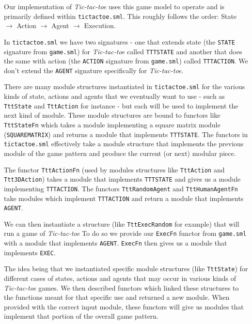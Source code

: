 \documentclass[9pt,letterpaper]{extarticle}
\begin{document}
  Our implementation of \textit{Tic-tac-toe} uses this game model to operate and
  is primarily defined within \texttt{tictactoe.sml}.
  This roughly follows the order:
  State $\rightarrow$ Action $\rightarrow$ Agent $\rightarrow$ Execution.

  In \texttt{tictactoe.sml} we have two signatures - one that extends state
  (the \texttt{STATE} signature from \texttt{game.sml}) for \textit{Tic-tac-toe}
  called \texttt{TTTSTATE} and another that does the same with action
  (the \texttt{ACTION} signature from \texttt{game.sml}) called
  \texttt{TTTACTION}.
  We don't extend the \texttt{AGENT} signature specifically for \textit{Tic-tac-toe}.

  There are many module structures instantiated in \texttt{tictactoe.sml}
  for the various kinds of state, actions and agents that we eventually want to
  use - such as \texttt{TttState} and \texttt{TttAction} for instance - but each will
  be used to implement the next kind of module.
  These module structures are bound to functors like \texttt{TttStateFn} which
  takes a module implementing a square matrix module (\texttt{SQUAREMATRIX})
  and returns a module that implements \texttt{TTTSTATE}. The functors in
  \texttt{tictactoe.sml} effectively take a module structure that implements the
  previous module of the game pattern and produce the current (or next)
  modular piece.
  
  The functor \texttt{TttActionFn} (used by modules structures like
  \texttt{TttAction} and \texttt{Ttt3DAction}) takes a module that implements
  \texttt{TTTSTATE} and gives us a module implementing \texttt{TTTACTION}.
  The functors \texttt{TttRandomAgent} and \texttt{TttHumanAgentFn} take
  modules which implement \texttt{TTTACTION} and return a module that implements
  \texttt{AGENT}.

  We can then instantiate a structure (like \texttt{TttExecRandom} for example)
  that will run a game of \textit{Tic-tac-toe}
  To do so we provide our \texttt{ExecFn} functor from
  \texttt{game.sml} with a module that implements \texttt{AGENT}.
  \texttt{ExecFn} then gives us a module that implements \texttt{EXEC}.
  
  The idea being that we instantiated specific module structures
  (like \texttt{TttState}) for different cases of states, actions and agents
  that may occur in various kinds of \textit{Tic-tac-toe} games.
  We then described functors which linked these structures to the functions
  meant for that specific use and returned a new module.
  When provided with the correct input module, these functors will give us
  modules that implement that portion of the overall game pattern.
\end{document}
